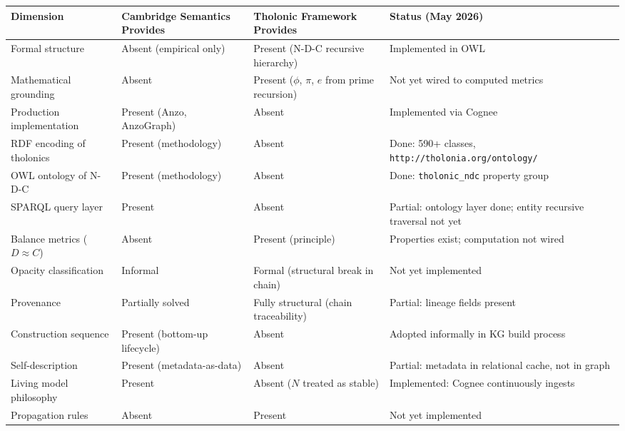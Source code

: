 \documentclass[
  11pt,
  letterpaper,
]{article}
\begin{document}
\begin{longtable}[]{@{}
  >{\raggedright\arraybackslash}p{}
  >{\raggedright\arraybackslash}p{}
  >{\raggedright\arraybackslash}p{}
  >{\raggedright\arraybackslash}p{}@{}}
\toprule\noalign{}
\begin{minipage}[b]{\linewidth}\raggedright
Dimension
\end{minipage} & \begin{minipage}[b]{\linewidth}\raggedright
Cambridge Semantics Provides
\end{minipage} & \begin{minipage}[b]{\linewidth}\raggedright
Tholonic Framework Provides
\end{minipage} & \begin{minipage}[b]{\linewidth}\raggedright
Status (May 2026)
\end{minipage} \\
\midrule\noalign{}
\endhead
\bottomrule\noalign{}
\endlastfoot
Formal structure & Absent (empirical only) & Present (N-D-C recursive
hierarchy) & Implemented in OWL \\
Mathematical grounding & Absent & Present (\(\phi\), \(\pi\), \(e\) from
prime recursion) & Not yet wired to computed metrics \\
Production implementation & Present (Anzo, AnzoGraph) & Absent &
Implemented via Cognee \\
RDF encoding of tholonics & Present (methodology) & Absent & Done: 590+
classes, \texttt{http://tholonia.org/ontology/} \\
OWL ontology of N-D-C & Present (methodology) & Absent & Done:
\texttt{tholonic\_ndc} property group \\
SPARQL query layer & Present & Absent & Partial: ontology layer done;
entity recursive traversal not yet \\
Balance metrics (\(D \approx C\)) & Absent & Present (principle) &
Properties exist; computation not wired \\
Opacity classification & Informal & Formal (structural break in chain) &
Not yet implemented \\
Provenance & Partially solved & Fully structural (chain traceability) &
Partial: lineage fields present \\
Construction sequence & Present (bottom-up lifecycle) & Absent & Adopted
informally in KG build process \\
Self-description & Present (metadata-as-data) & Absent & Partial:
metadata in relational cache, not in graph \\
Living model philosophy & Present & Absent (\(N\) treated as stable) &
Implemented: Cognee continuously ingests \\
Propagation rules & Absent & Present & Not yet implemented \\
\end{longtable}
\end{document}
